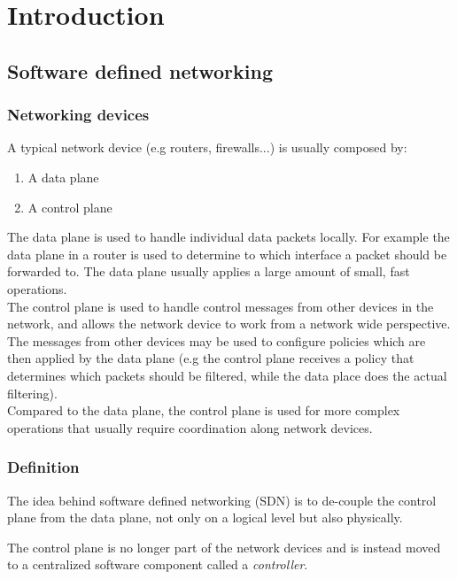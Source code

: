 \documentclass{report}
\begin{document}
	
	
	\pagebreak
	
	\pagebreak
	\tableofcontents
	\thispagestyle{empty}
	\pagebreak
	\chapter{Introduction}
	\setcounter{page}{1}
	
	
	
\section{Software defined networking}
	
	\subsection{Networking devices}
	A typical network device (e.g routers, firewalls...) is usually composed by:
	\begin{enumerate}
		\item A data plane 
		\item A control plane
	\end{enumerate}
	
	The data plane is used to handle individual data packets locally.
	For example the data plane in a router is used to determine to which interface a packet should be forwarded to.
	The data plane usually applies a large amount of small, fast operations. \\
	The control plane is used to handle control messages from other devices in the network, and allows the network device to work from a network wide perspective. \\
	The messages from other devices may be  used to configure policies which are then applied by the data plane (e.g the control plane receives a policy that determines which packets should be filtered, while the data place does the actual filtering). \\
	Compared to the data plane, the control plane is used for more complex operations that usually require coordination along network devices.
	

	
	\subsection{Definition}
	The idea behind software defined networking (SDN) is to de-couple the control plane from the data plane, not only on a logical level but also physically.
	
	The control plane is no longer part of the network devices and is instead moved to a  centralized software component called a \textit{controller}.
	
\end{document}
